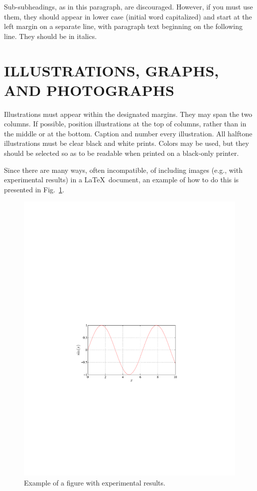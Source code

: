 \documentclass{article}
\begin{document}
\begin{sloppy}
Sub-subheadings, as in this paragraph, are discouraged. 
However, if you must use them, they should appear in 
lower case (initial word capitalized) and start at the 
left margin on a separate line, with paragraph
text beginning on the following line. They should be 
in italics. 
 

\section{ILLUSTRATIONS, GRAPHS, AND PHOTOGRAPHS}
\label{sec:illust}

Illustrations must appear within the designated margins.  
They may span the two columns. If possible, position 
illustrations at the top of columns, rather than in 
the middle or at the bottom. Caption and number every 
illustration. All halftone illustrations must be clear 
black and white prints. Colors may be used, but they 
should be selected so as to be readable when printed 
on a black-only printer.

Since there are many ways, often incompatible, of 
including images (e.g., with experimental results) 
in a \LaTeX\ document, an example of how to do
this is presented in Fig.~\ref{fig:results}.

\begin{figure}[t]
  \centering
  \centerline{\includegraphics[width=\columnwidth]{fig1a}}
  \caption{Example of a figure with experimental results.}
  \label{fig:results}
\end{figure}


\end{sloppy}
\end{document}

